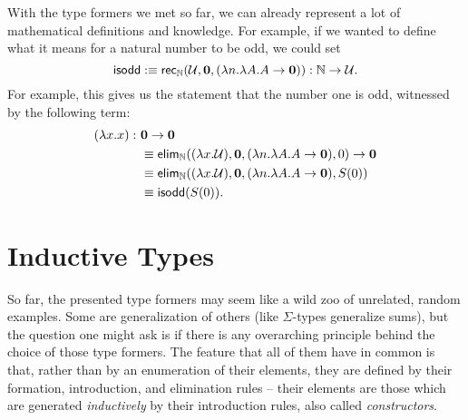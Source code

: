 With the type formers we met so far, we can already represent a lot of mathematical
definitions and knowledge.
For example, if we wanted to define what it means for a natural number to be odd,
we could set
\begin{equation*}
\mathsf{isodd} :\equiv \mathsf{rec}_{\mathbb{N}}(\mathcal{U}, \mathbf{0}, (\lambda n. \lambda A. A \to \mathbf{0})) : \mathbb{N} \to \mathcal{U} \text{.}
\end{equation*}
For example, this gives us the statement that the number one is odd, witnessed by
the following term:
\begin{align*}
(\lambda x. x) :~ & \mathbf{0} \to \mathbf{0} \\
 &\equiv \mathsf{elim}_{\mathbb{N}}((\lambda x. \mathcal{U}), \mathbf{0}, (\lambda n. \lambda A. A \to \mathbf{0}), 0)
  \to \mathbf{0}\\
 &\equiv \mathsf{elim}_{\mathbb{N}}((\lambda x. \mathcal{U}), \mathbf{0}, (\lambda n. \lambda A. A \to \mathbf{0}), S(0))\\
 &\equiv \mathsf{isodd}(S(0)) \text{.}
\end{align*}

\section{Inductive Types}\label{sec:tt-w}

So far, the presented type formers may seem like a wild zoo of unrelated,
random examples.
Some are generalization of others (like $\Sigma$-types generalize sums),
but the question one might ask is if there is any overarching principle behind
the choice of those type formers.
The feature that all of them have in common is that, rather than by an enumeration
of their elements,
they are defined by their formation, introduction, and elimination rules -- their
elements are those which are generated \emph{inductively} by their introduction
rules, also called \emph{constructors}.

